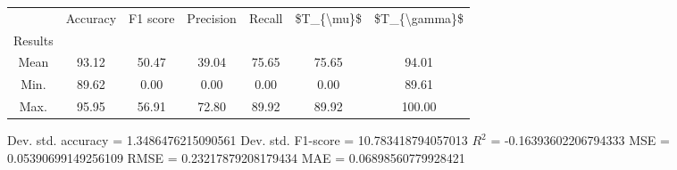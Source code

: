 \begin{tabular}{|c|c|c|c|c|c|c|}
\toprule
{} &  Accuracy &  F1 score &  Precision &  Recall &  \$T\_\{\textbackslash mu\}\$ &  \$T\_\{\textbackslash gamma\}\$ \\
Results &           &           &            &         &            &               \\
\hline
Mean    &     93.12 &     50.47 &      39.04 &   75.65 &      75.65 &         94.01 \\
Min.    &     89.62 &      0.00 &       0.00 &    0.00 &       0.00 &         89.61 \\
Max.    &     95.95 &     56.91 &      72.80 &   89.92 &      89.92 &        100.00 \\
\bottomrule
\end{tabular}

 Dev. std. accuracy = 1.3486476215090561
 Dev. std. F1-score = 10.783418794057013
 $R^2$ = -0.16393602206794333
 MSE = 0.05390699149256109
 RMSE = 0.23217879208179434
 MAE = 0.06898560779928421